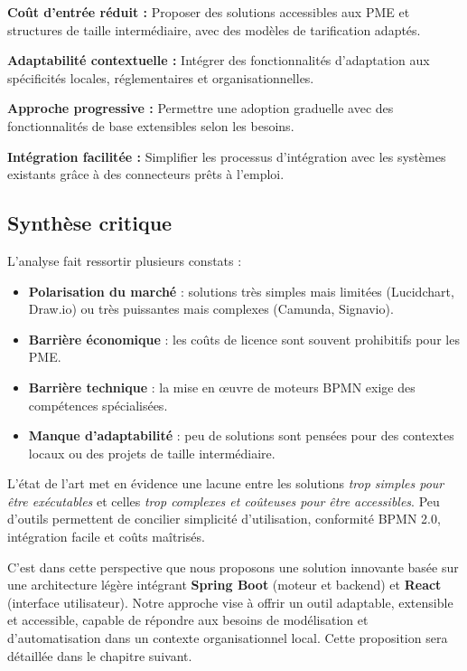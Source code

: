 \textbf{Coût d'entrée réduit :} Proposer des solutions accessibles aux PME et structures de taille intermédiaire, avec des modèles de tarification adaptés.

\textbf{Adaptabilité contextuelle :} Intégrer des fonctionnalités d'adaptation aux spécificités locales, réglementaires et organisationnelles.

\textbf{Approche progressive :} Permettre une adoption graduelle avec des fonctionnalités de base extensibles selon les besoins.

\textbf{Intégration facilitée :} Simplifier les processus d'intégration avec les systèmes existants grâce à des connecteurs prêts à l'emploi.

\subsection{Synthèse critique}

L’analyse fait ressortir plusieurs constats :

\begin{itemize}
    \item \textbf{Polarisation du marché} : solutions très simples mais limitées (Lucidchart, Draw.io) ou très puissantes mais complexes (Camunda, Signavio).
    \item \textbf{Barrière économique} : les coûts de licence sont souvent prohibitifs pour les PME.
    \item \textbf{Barrière technique} : la mise en œuvre de moteurs BPMN exige des compétences spécialisées.
    \item \textbf{Manque d’adaptabilité} : peu de solutions sont pensées pour des contextes locaux ou des projets de taille intermédiaire.
\end{itemize}

L’état de l’art met en évidence une lacune entre les solutions \textit{trop simples pour être exécutables} et celles \textit{trop complexes et coûteuses pour être accessibles}. Peu d’outils permettent de concilier simplicité d’utilisation, conformité BPMN 2.0, intégration facile et coûts maîtrisés.

C’est dans cette perspective que nous proposons une solution innovante basée sur une architecture légère intégrant \textbf{Spring Boot} (moteur et backend) et \textbf{React} (interface utilisateur). Notre approche vise à offrir un outil adaptable, extensible et accessible, capable de répondre aux besoins de modélisation et d’automatisation dans un contexte organisationnel local. Cette proposition sera détaillée dans le chapitre suivant.

